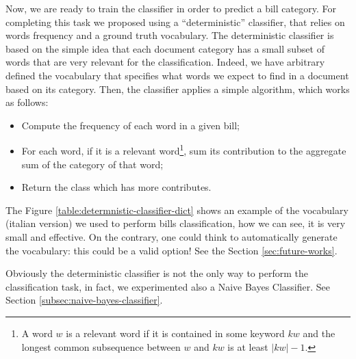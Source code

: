 \documentclass[10pt,twocolumn,letterpaper]{article}
\begin{document}
Now, we are ready to train the classifier in order to predict a bill
category. For completing this task we proposed using a
``deterministic'' classifier, that relies on words frequency and a
ground truth vocabulary. The deterministic classifier is based on the
simple idea that each document category has a small subset of words
that are very relevant for the classification. Indeed, we have
arbitrary defined the vocabulary that specifies what words we expect
to find in a document based on its category. Then, the classifier
applies a simple algorithm, which works as follows:

\begin{itemize}
  \item Compute the frequency of each word in a given bill;
  \item For each word, if it is a relevant word\footnote{A word $w$ is
    a relevant word if it is contained in some keyword $kw$ and the
    longest common subsequence between $w$ and $kw$ is at least $|kw|
    - 1$.}, sum its contribution to the aggregate sum of the category
    of that word;
  \item Return the class which has more contributes.
\end{itemize}

The Figure \ref{table:determnistic-classifier-dict} shows an example
of the vocabulary (italian version) we used to perform bills
classification, how we can see, it is very small and effective.  On
the contrary, one could think to automatically generate the
vocabulary: this could be a valid option! See the Section
\ref{sec:future-works}.

Obviously the deterministic classifier is not the only way to perform
the classification task, in fact, we experimented also a Naive Bayes
Classifier. See Section \ref{subsec:naive-bayes-classifier}.
\end{document}
